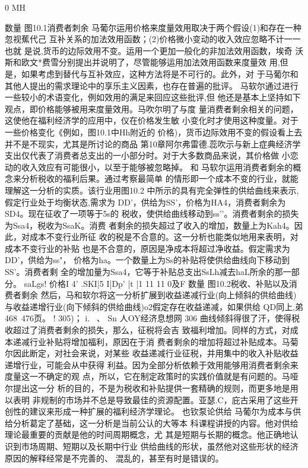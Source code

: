 0
MH

数量
图10.1消费者刺余
马葡尔运用价格来度量效用取决于两个假设(1)和存在一种忽视蕉代己
互补关系的加法效用函数；(2)价格微小变动的收入效应忽略不计一一也就
是说,货币的边际效用不变。运用一个更加一般化的非加法效用函数，埃奇
沃斯和欧文*费雪分别提出并说明了，尽管能够运用加法效用函数来度量效
用,但是，如果考虑到替代与互补效应，这种方法将是不可行的。此外，对
于马葡尔和其他人提出的需求理论中的享乐主义因素，也存在普遍的批评。
马软尔通过进行一些较小的术语变化，例如效用的满足来回应这些批评,但
他还是基本上坚持如下观点，即价格能够被用来度量效用。马吹尔明了与度
量消费者剩余相关的问题，这使他在福利经济学的应用中，仪在价格发生敏
小变化时才使用这种度量。对于一些价格变化《例如，图10.1中Hh附近的
价格)，货币边际效用不变的假设看上去并不是不现实，尤其是所讨论的商品
第10章阿尔弗雷德.蕊吹示与新上症典经济学
支出仅代表了消费者总支出的一小部分时。对于大多数商品来说，其价格做
小恋动的收入效应有可能很小，以至于能够被忽略掉。
和%
马软尔运用消费者剩余的概念来分析税收的福利后果。通过考察最简单
的情形即一个成本不变的行业，就能理解这一分析的实质。该行业用图10.2
中所示的具有完全弹性的供给曲线来表示,假定行业处于均衡状态,需求为
DD'，供给为SS'，价格为HA4，消费者剩余为SD4。现在征收了一项等于5s的
税收，使供给曲线移动到ss’'。消费者剩余的损失为Ssa4，税收为SsaK。消费
者剩余的损失超过了收入的增加，数量上为Kah4。因此，对成本不变行业所征
收的税是不合意的。这一分析也能类似地用来表明，对成本不变行业的补贴
也是不合意的，原因是净成本将超过净收益。假定需求为DD'，供给为ss"，
价格为ha。一个数量上为Ss的补贴将使供给曲线向下移动到SS'。消费者剩
全的增加量为Ssa4，它等于补贴总支出SsLh减去haL所余的那一部分。
saLgs!
价格I
4'
.SKI|5
I|Dp'
|t
|1
11
11
0及F
数量
图10.2税收、补贴以及消费者剩余
然后，马和软尔将这一分析扩展到收益递减行业(向上倾斜的供给曲线)
与收益递增行业(向下倾斜的供给曲线)o2假定存在收益递减，如果供给
QD同上,弟468~476页。
!
305)；
i.
~、
Sn
人OY经济息想网
306
曲线倾斜得很了汗，使得税收超过了消费者剩余的损失，那么，征税将会吉
致福利增加。同样的方式，对成本递减行业补贴将增加福利，原因在于消
费者剩余的增加将超过补贴成本。马菊尔因此断定，对社会来说，对某些
收益递减行业征税，并用集中的收入补贴收益递增行业，可能会从中获得
利益。因为全部分析依赖于效用能够用消费者剩余来度量这一不确定的观
点，所以，它在制定政策时的实践价值就是有问题的。马哑尔提出这一分
析的目的，不是为税收和补贴提供一套精确的规则，而更多地是用以表明
非规制的市场并不总是导致最佳的资源配置。亚瑟.C，庇古采用了这些开
创性的建议来形成一种扩展的福利经济学理论。
也钦泵论供给
马葡尔为成本与供给分析葛定了基础，这一分析是当前公认的大等本
科课程讲授的内容。他对供给理论最重要的贡献是他的时间周期概念，尤
其是短期与长期的概念。他正确地认识到市场周期、短期以及长期中行业
供给曲线的形状，虽然他对这些形状的经济原因的解释经常是不完善的、
混乱的，甚至有时是错误的。

